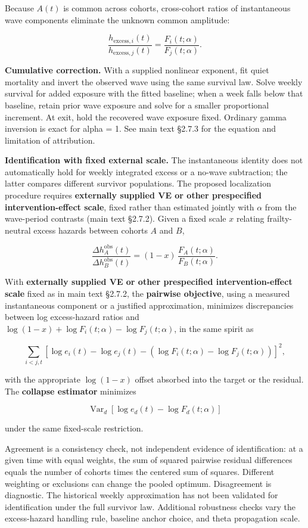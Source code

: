 \documentclass[
]{article}
\begin{document}
Because \(A(t)\) is common across cohorts, cross-cohort ratios of instantaneous wave components eliminate the unknown common amplitude:

\[\frac{h_{\mathrm{excess},i}(t)}{h_{\mathrm{excess},j}(t)}
=
\frac{F_i(t;\alpha)}{F_j(t;\alpha)}.\]

\textbf{Cumulative correction.} With a supplied nonlinear exponent, fit quiet mortality and invert the observed wave using the same survival law. Solve weekly survival for added exposure with the fitted baseline; when a week falls below that baseline, retain prior wave exposure and solve for a smaller proportional increment. At exit, hold the recovered wave exposure fixed. Ordinary gamma inversion is exact for alpha = 1. See main text §2.7.3 for the equation and limitation of attribution.

\textbf{Identification with fixed external scale.} The instantaneous identity does not automatically hold for weekly integrated excess or a no-wave subtraction; the latter compares different survivor populations. The proposed localization procedure requires \textbf{externally supplied VE or other prespecified intervention-effect scale}, fixed rather than estimated jointly with \(\alpha\) from the wave-period contrasts (main text §2.7.2). Given a fixed scale \(x\) relating frailty-neutral excess hazards between cohorts \(A\) and \(B\),

\[\frac{\Delta h_A^{\mathrm{obs}}(t)}{\Delta h_B^{\mathrm{obs}}(t)}
=
(1-x)\,\frac{F_A(t;\alpha)}{F_B(t;\alpha)}.\]

With \textbf{externally supplied VE or other prespecified intervention-effect scale} fixed as in main text §2.7.2, the \textbf{pairwise objective}, using a measured instantaneous component or a justified approximation, minimizes discrepancies between log excess-hazard ratios and \(\log(1-x)+\log F_i(t;\alpha)-\log F_j(t;\alpha)\), in the same spirit as

\[\sum_{i<j,t}
\left[
\log e_i(t)-\log e_j(t)
-\left(\log F_i(t;\alpha)-\log F_j(t;\alpha)\right)
\right]^2,\]

with the appropriate \(\log(1-x)\) offset absorbed into the target or the residual. The \textbf{collapse estimator} minimizes

\[\operatorname{Var}_d\!\left[
\log e_d(t)-\log F_d(t;\alpha)
\right]\]

under the same fixed-scale restriction.

Agreement is a consistency check, not independent evidence of identification: at a given time with equal weights, the sum of squared pairwise residual differences equals the number of cohorts times the centered sum of squares. Different weighting or exclusions can change the pooled optimum. Disagreement is diagnostic. The historical weekly approximation has not been validated for identification under the full survivor law. Additional robustness checks vary the excess-hazard handling rule, baseline anchor choice, and theta propagation scale.
\end{document}
